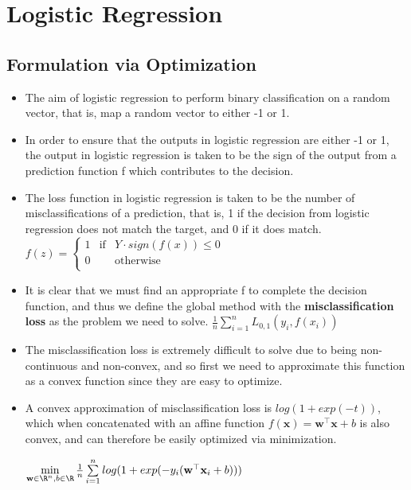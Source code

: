 \documentclass[english]{latex4ei/latex4ei_sheet}
\begin{document}
\section{Logistic Regression}
\begin{sectionbox}
\subsection{Formulation via Optimization}
\begin{itemize}
\item The aim of logistic regression to perform binary classification on a random vector, that is, map a random vector to either -1 or 1.
\item In order to ensure that the outputs in logistic regression are either -1 or 1, the output in logistic regression is taken to be the sign of the output from a prediction function f which contributes to the decision.
\item The loss function in logistic regression is taken to be the number of misclassifications of a prediction, that is, 1 if the decision from logistic regression does not match the target, and 0 if it does match.
$f(z) = \left\{ \begin{array}{rcl}
     1 & \mbox{if}
& Y\cdot sign(f(x))\leq 0 \\ 0 & & \mbox{otherwise}\\
\end{array}\right.$
\item It is clear that we must find an appropriate f  to complete the decision function, and thus we define the global method with the \textbf{misclassification loss} as the problem we need to solve.
$ \frac{1}{n}\sum\limits_{i=1}^nL_{0,1}(y_i,f(x_i))$
\item The misclassification loss is extremely difficult to solve due to being non-continuous and non-convex, and so first we need to approximate this function as a convex function since they are easy to optimize.
\item A convex approximation of misclassification loss is $log(1 + exp(-t))$, which when concatenated with  an affine function $f(\mathbf{x})=\mathbf{w^{\top}x}+b$ is also convex, and can therefore be easily optimized via minimization.\\
\begin{center}
\begin{emphbox}
    $\min\limits_{\mathbf{w}\in\R^n,b\in\R}\frac{1}{n}\sum\limits_{i=1}^nlog(1+exp(-y_i(\mathbf{w}^{\top}\mathbf{x}_i+b)))$
    \end{emphbox}

\end{center}
\end{itemize}
\end{sectionbox}
\end{document}
